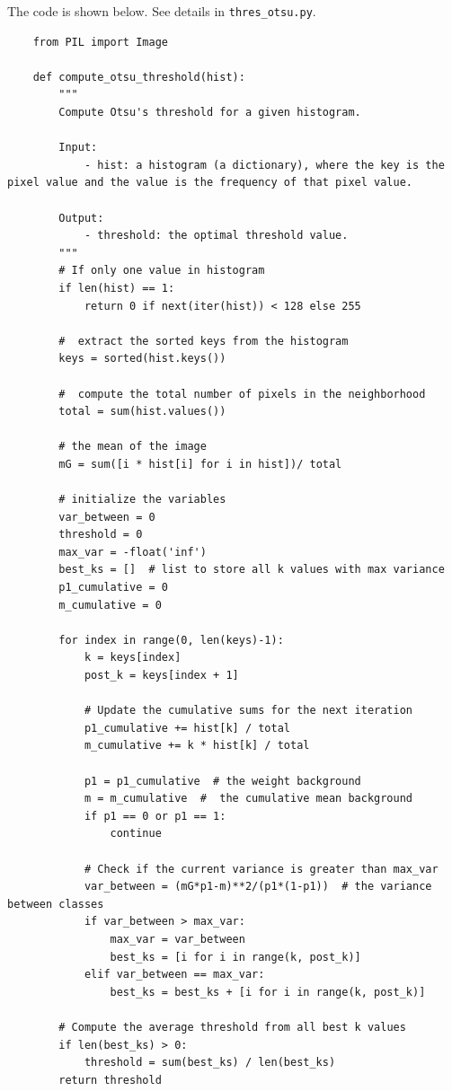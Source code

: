 \documentclass[UTF8]{ctexart}
\begin{document}
The code is shown below. See details in \texttt{thres\_otsu.py}.
\begin{lstlisting}
    from PIL import Image

    def compute_otsu_threshold(hist):
        """
        Compute Otsu's threshold for a given histogram.
        
        Input:
            - hist: a histogram (a dictionary), where the key is the pixel value and the value is the frequency of that pixel value.
            
        Output:
            - threshold: the optimal threshold value.
        """
        # If only one value in histogram
        if len(hist) == 1:
            return 0 if next(iter(hist)) < 128 else 255
        
        #  extract the sorted keys from the histogram
        keys = sorted(hist.keys())
        
        #  compute the total number of pixels in the neighborhood
        total = sum(hist.values())
        
        # the mean of the image
        mG = sum([i * hist[i] for i in hist])/ total
        
        # initialize the variables
        var_between = 0
        threshold = 0
        max_var = -float('inf')
        best_ks = []  # list to store all k values with max variance
        p1_cumulative = 0
        m_cumulative = 0
    
        for index in range(0, len(keys)-1):
            k = keys[index]
            post_k = keys[index + 1]
            
            # Update the cumulative sums for the next iteration
            p1_cumulative += hist[k] / total
            m_cumulative += k * hist[k] / total
            
            p1 = p1_cumulative  # the weight background
            m = m_cumulative  #  the cumulative mean background
            if p1 == 0 or p1 == 1:
                continue
            
            # Check if the current variance is greater than max_var
            var_between = (mG*p1-m)**2/(p1*(1-p1))  # the variance between classes
            if var_between > max_var:
                max_var = var_between
                best_ks = [i for i in range(k, post_k)]
            elif var_between == max_var:
                best_ks = best_ks + [i for i in range(k, post_k)]
            
        # Compute the average threshold from all best k values
        if len(best_ks) > 0:
            threshold = sum(best_ks) / len(best_ks)
        return threshold
    

\end{lstlisting}
\end{document}
